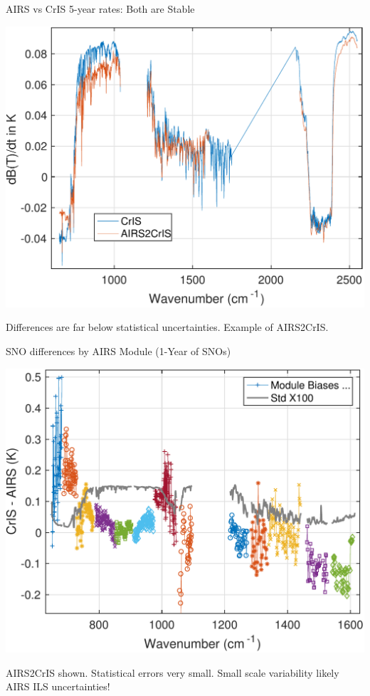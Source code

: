 \documentclass[10pt,t]{beamer}
\begin{document}
\begin{frame}[label={sec:orga468c42}]{AIRS vs CrIS 5-year rates: Both are Stable}
\vspace{-0.1in}
\begin{center}
\includegraphics[width=0.8\linewidth]{./Figs/Pdf/airs_vs_cris_btrate_global.pdf}
\end{center}
Differences are far below statistical uncertainties.  Example of AIRS2CrIS.
\end{frame}

\begin{frame}[label={sec:orga10a827}]{SNO differences by AIRS Module (1-Year of SNOs)}
\vspace{-0.1in}
\begin{center}
\includegraphics[width=0.8\linewidth]{./Figs/Pdf/lls_cris_minus_airs.pdf}
\end{center}
\vspace{-0.05in}
\small
AIRS2CrIS shown. Statistical errors very small.  Small scale variability likely AIRS ILS uncertainties!
\end{frame}
\end{document}
